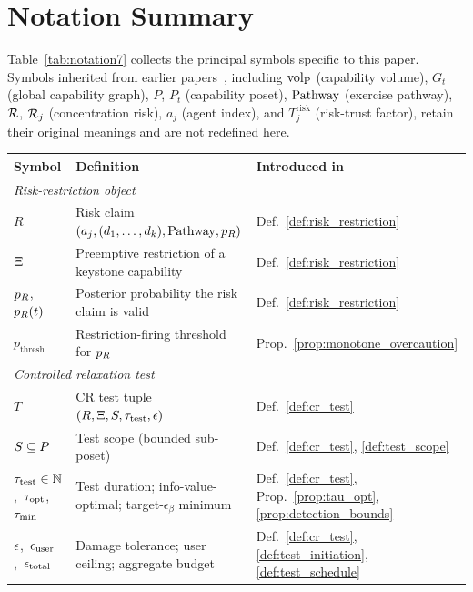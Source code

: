 \section{Notation Summary}
\label{app:notation}

Table~\ref{tab:notation7} collects the principal symbols specific
to this paper.  Symbols inherited from earlier
papers~\citep{lasser2026poset, lasser2026horizon, lasser2026scm,
lasser2026exo, lasser2026phase}, including ${\operatorname{vol}_{\mathrm{P}}}$
(capability volume), $G_t$ (global capability graph), $P$, $P_t$
(capability poset), $\mathrm{Pathway}$ (exercise pathway), $\mathcal{R}$,
$\mathcal{R}_j$ (concentration risk), $a_j$ (agent index), and
$T^{\mathrm{risk}}_j$ (risk-trust factor), retain their original
meanings and are not redefined here.

\begin{table}[h]
\centering
\small
\begin{tabular}{@{}p{3.0cm}p{7.6cm}p{3.9cm}@{}}
\toprule
\textbf{Symbol} & \textbf{Definition} & \textbf{Introduced in} \\
\midrule
\multicolumn{3}{l}{\emph{Risk-restriction object}} \\
$R$
  & Risk claim
    $(a_j, (d_1, \ldots, d_k), \mathrm{Pathway}, p_R)$
  & Def.~\ref{def:risk_restriction} \\
$\Xi$
  & Preemptive restriction of a keystone capability
  & Def.~\ref{def:risk_restriction} \\
$p_R$, $p_R(t)$
  & Posterior probability the risk claim is valid
  & Def.~\ref{def:risk_restriction} \\
$p_{\mathrm{thresh}}$
  & Restriction-firing threshold for $p_R$
  & Prop.~\ref{prop:monotone_overcaution} \\
\midrule
\multicolumn{3}{l}{\emph{Controlled relaxation test}} \\
$T$
  & CR test tuple
    $(R, \Xi, S, \tau_{\mathrm{test}}, \epsilon)$
  & Def.~\ref{def:cr_test} \\
$S \subseteq P$
  & Test scope (bounded sub-poset)
  & Def.~\ref{def:cr_test}, \ref{def:test_scope} \\
$\tau_{\mathrm{test}} \in \mathbb{N}$,\ $\tau_{\mathrm{opt}}$,\ $\tau_{\mathrm{min}}$
  & Test duration; info-value-optimal; target-$\epsilon_\beta$ minimum
  & Def.~\ref{def:cr_test}, Prop.~\ref{prop:tau_opt}, \ref{prop:detection_bounds} \\
$\epsilon$,\ $\epsilon_{\mathrm{user}}$,\ $\epsilon_{\mathrm{total}}$
  & Damage tolerance; user ceiling; aggregate budget
  & Def.~\ref{def:cr_test}, \ref{def:test_initiation}, \ref{def:test_schedule} \\

\end{tabular}
\end{table}
